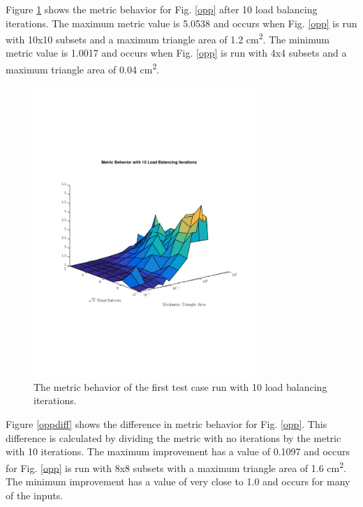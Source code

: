\documentclass{anstrans}
\begin{document}
Figure \ref{oppiter} shows the metric behavior for Fig. \ref{opp} after 10 load balancing iterations. The maximum metric value is 5.0538 and occurs when Fig. \ref{opp} is run with 10x10 subsets and a maximum triangle area of 1.2 cm\textsuperscript{2}. The minimum metric value is 1.0017 and occurs when Fig. \ref{opp} is run with 4x4 subsets and a maximum triangle area of 0.04 cm\textsuperscript{2}.

\begin{figure}
\centering
\includegraphics[width=85mm, trim = 0cm 5cm 0cm 5cm,clip]{figures/OppIter.pdf}
\caption{The metric behavior of the first test case run with 10 load balancing iterations.}
\label{oppiter}
\end{figure}

Figure \ref{oppdiff} shows the difference in metric behavior for Fig. \ref{opp}. This difference is calculated by dividing the metric with no iterations by the metric with 10 iterations. The maximum improvement has a value of 0.1097 and occurs for Fig. \ref{opp} is run with 8x8 subsets with a maximum triangle area of 1.6 cm\textsuperscript{2}. The minimum improvement has a value of very close to 1.0 and occurs for many of the inputs. 
\end{document}
